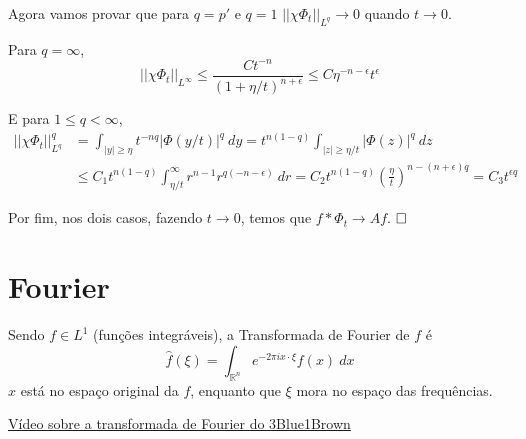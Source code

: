 \documentclass[11pt]{article}
\newcommand{\qed}{$\hfill\square$}
\newcommand{\Rn}{{\mathbb{R}^n}}
\newcommand{\e}{\epsilon}
\newcommand{\norm}[2]{\left|\left|#1\right|\right|_{L^{#2}}}
\begin{document}
Agora vamos provar que para \(q=p'\) e \(q=1\) \(\norm{\chi \Phi_t}{q}\rightarrow 0 \) quando \(t \rightarrow 0 \).

Para \(q=\infty\), \[\norm{\chi\Phi_t}{\infty} \leq \frac{C t^{-n}}{(1 + \eta/t)^{n+\e}} \leq C \eta^{-n-\e} t^\e \]

E para \(1 \leq q < \infty\), \begin{align*}
	\norm{\chi\Phi_t}{q}^q &= \int_{|y|\geq\eta} t^{-nq} | \Phi(y/t) |^q\ dy= t^{n(1-q)}\int_{|z|\geq \eta/t} |\Phi(z)|^q\ dz\\
	&\leq C_1 t^{n(1-q)}\int_{\eta/t}^{\infty} r^{n-1} r^{q(-n-\e)}\ dr = C_2 t^{n(1-q)} \left(\frac{\eta}{t}\right)^{n -(n+\e)q} = C_3 t^{\e q}
\end{align*}

Por fim, nos dois casos, fazendo \(t \rightarrow 0\), temos que \(f * \Phi_t \rightarrow Af\). \qed






















\section{Fourier}

Sendo \(f \in L^1\) (funções integráveis), a Transformada de Fourier de \(f\) é  \[\hat{f}(\xi) = \int_\Rn e^{-2\pi i x \cdot \xi} f(x)\ dx\]
\(x\) está no espaço original da \(f\), enquanto que \(\xi\) mora no espaço das frequências.

\href{https://www.youtube.com/watch?v=spUNpyF58BY}{Vídeo sobre a transformada de Fourier do 3Blue1Brown}
\end{document}
